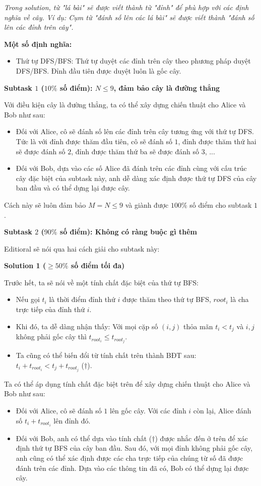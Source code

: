 \textit{Trong solution, từ "lá bài" sẽ được viết thành từ "đỉnh" để phù hợp với các định nghĩa về cây. Ví dụ: Cụm từ "đánh số lên các lá bài" sẽ được viết thành "đánh số lên các đỉnh trên cây".}

\textbf{Một số định nghĩa:}
\begin{itemize}
   \item Thứ tự DFS/BFS: Thứ tự duyệt các đỉnh trên cây theo phương pháp duyệt DFS/BFS. Đỉnh đầu tiên được duyệt luôn là gốc cây.
\end{itemize}

\textbf{Subtask $1$ ($10\%$ số điểm): $N\le 9$, đảm bảo cây là đường thẳng}

Với điều kiện cây là đường thẳng, ta có thể xây dựng chiến thuật cho Alice và Bob như sau:
\begin{itemize}
   \item Đối với Alice, cô sẽ đánh số lên các đỉnh trên cây tương ứng với thứ tự DFS. Tức là với đỉnh được thăm đầu tiên, cô sẽ đánh số $1$, đỉnh được thăm thứ hai sẽ được đánh số $2$, đỉnh được thăm thứ ba sẽ được đánh số $3$, ...
   \item Đối với Bob, dựa vào các số Alice đã đánh trên các đỉnh cùng với cấu trúc cây đặc biệt của subtask này, anh dễ dàng xác định được thứ tự DFS của cây ban đầu và có thể dựng lại được cây.
\end{itemize}

Cách này sẽ luôn đảm bảo $M=N\le 9$ và giành được $100\%$ số điểm cho subtask $1$.

\textbf{Subtask $2$ ($90\%$ số điểm): Không có ràng buộc gì thêm}

Editioral sẽ nói qua hai cách giải cho subtask này:

\textbf{Solution 1 ($\ge 50\%$ số điểm tối đa)}

Trước hết, ta sẽ nói về một tính chất đặc biệt của thứ tự BFS:
\begin{itemize}
   \item Nếu gọi $t_i$ là thời điểm đỉnh thứ $i$ được thăm theo thứ tự BFS, $root_i$ là cha trực tiếp của đỉnh thứ $i$.
   \item Khi đó, ta dễ dàng nhận thấy: Với mọi cặp số $(i,j)$ thỏa mãn $t_i<t_j$ và $i,j$ không phải gốc cây thì $t_{root_i}\le t_{root_j}$.
   \item Ta cũng có thể biến đổi từ tính chất trên thành BĐT sau: $t_i+t_{root_i}<t_j+t_{root_j}$ ($\dagger$).
\end{itemize}

Ta có thể áp dụng tính chất đặc biệt trên để xây dựng chiến thuật cho Alice và Bob như sau:
\begin{itemize}
   \item Đối với Alice, cô sẽ đánh số $1$ lên gốc cây. Với các đỉnh $i$ còn lại, Alice đánh số $t_i+t_{root_i}$ lên đỉnh đó.
   \item Đối với Bob, anh có thể dựa vào tính chất ($\dagger$) được nhắc đến ở trên để xác định thứ tự BFS của cây ban đầu. Sau đó, với mọi đỉnh không phải gốc cây, anh cũng có thể xác định được các cha trực tiếp của chúng từ số đã được đánh trên các đỉnh. Dựa vào các thông tin đã có, Bob có thể dựng lại được cây.
\end{itemize}

